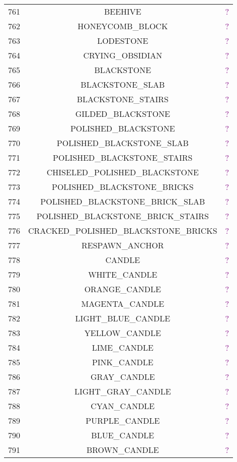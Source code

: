 \documentclass[11pt]{article}
\newcommand\myworries[1]{\textcolor{purple}{#1}}
\begin{document}
\begin{longtable}{ |c|c|c| }
	761 & BEEHIVE & \myworries{?} \\
	762 & HONEYCOMB\_BLOCK & \myworries{?} \\
	763 & LODESTONE & \myworries{?} \\
	764 & CRYING\_OBSIDIAN & \myworries{?} \\
	765 & BLACKSTONE & \myworries{?} \\
	766 & BLACKSTONE\_SLAB & \myworries{?} \\
	767 & BLACKSTONE\_STAIRS & \myworries{?} \\
	768 & GILDED\_BLACKSTONE & \myworries{?} \\
	769 & POLISHED\_BLACKSTONE & \myworries{?} \\
	770 & POLISHED\_BLACKSTONE\_SLAB & \myworries{?} \\
	771 & POLISHED\_BLACKSTONE\_STAIRS & \myworries{?} \\
	772 & CHISELED\_POLISHED\_BLACKSTONE & \myworries{?} \\
	773 & POLISHED\_BLACKSTONE\_BRICKS & \myworries{?} \\
	774 & POLISHED\_BLACKSTONE\_BRICK\_SLAB & \myworries{?} \\
	775 & POLISHED\_BLACKSTONE\_BRICK\_STAIRS & \myworries{?} \\
	776 & CRACKED\_POLISHED\_BLACKSTONE\_BRICKS & \myworries{?} \\
	777 & RESPAWN\_ANCHOR & \myworries{?} \\
	778 & CANDLE & \myworries{?} \\
	779 & WHITE\_CANDLE & \myworries{?} \\
	780 & ORANGE\_CANDLE & \myworries{?} \\
	781 & MAGENTA\_CANDLE & \myworries{?} \\
	782 & LIGHT\_BLUE\_CANDLE & \myworries{?} \\
	783 & YELLOW\_CANDLE & \myworries{?} \\
	784 & LIME\_CANDLE & \myworries{?} \\
	785 & PINK\_CANDLE & \myworries{?} \\
	786 & GRAY\_CANDLE & \myworries{?} \\
	787 & LIGHT\_GRAY\_CANDLE & \myworries{?} \\
	788 & CYAN\_CANDLE & \myworries{?} \\
	789 & PURPLE\_CANDLE & \myworries{?} \\
	790 & BLUE\_CANDLE & \myworries{?} \\
	791 & BROWN\_CANDLE & \myworries{?} \\

\end{longtable}
\end{document}
